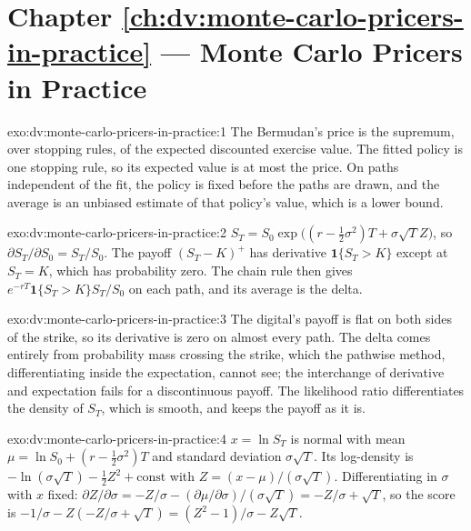 \section*{Chapter \ref{ch:dv:monte-carlo-pricers-in-practice} --- Monte Carlo Pricers in Practice}

\begin{solution}{exo:dv:monte-carlo-pricers-in-practice:1}
The Bermudan's price is the supremum, over stopping rules, of the expected discounted exercise value. The fitted policy is one stopping rule, so its
expected value is at most the price. On paths independent of the fit, the policy is fixed before the paths are drawn, and the average is an unbiased
estimate of that policy's value, which is a lower bound.
\end{solution}

\begin{solution}{exo:dv:monte-carlo-pricers-in-practice:2}
$S_T=S_0\exp\bigl((r-\tfrac12\sigma^2)T+\sigma\sqrt T Z\bigr)$, so $\partial S_T/\partial S_0=S_T/S_0$. The payoff $(S_T-K)^+$ has derivative
$\mathbf 1\{S_T>K\}$ except at $S_T=K$, which has probability zero. The chain rule then gives $e^{-rT}\mathbf 1\{S_T>K\}S_T/S_0$ on each path, and its
average is the delta.
\end{solution}

\begin{solution}{exo:dv:monte-carlo-pricers-in-practice:3}
The digital's payoff is flat on both sides of the strike, so its derivative is zero on almost every path. The delta comes entirely from probability mass
crossing the strike, which the pathwise method, differentiating inside the expectation, cannot see; the interchange of derivative and expectation fails
for a discontinuous payoff. The likelihood ratio differentiates the density of $S_T$, which is smooth, and keeps the payoff as it is.
\end{solution}

\begin{solution}{exo:dv:monte-carlo-pricers-in-practice:4}
$x=\ln S_T$ is normal with mean $\mu=\ln S_0+(r-\tfrac12\sigma^2)T$ and standard deviation $\sigma\sqrt T$. Its log-density is
$-\ln(\sigma\sqrt T)-\tfrac12Z^2+\text{const}$ with $Z=(x-\mu)/(\sigma\sqrt T)$. Differentiating in $\sigma$ with $x$ fixed:
$\partial Z/\partial\sigma=-Z/\sigma-(\partial\mu/\partial\sigma)/(\sigma\sqrt T)=-Z/\sigma+\sqrt T$, so the score is
$-1/\sigma-Z(-Z/\sigma+\sqrt T)=(Z^2-1)/\sigma-Z\sqrt T$.
\end{solution}

